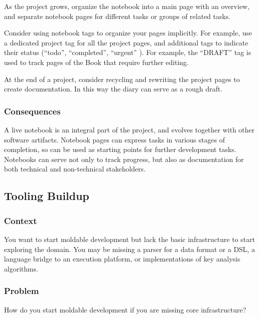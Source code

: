\documentclass[sigconf]{acmart}
\newcommand{\GT}{\lst{GT}\xspace} %
\begin{document}
As the project grows, organize the notebook into a main page with an overview, and separate notebook pages for different tasks or groups of related tasks.

Consider using notebook tags to organize your pages implicitly. For example, use a dedicated project tag for all the project pages, and additional tags to indicate their status (``todo'', ``completed'', ``urgent'' \etc).
For example, the ``DRAFT'' tag is used to track pages of the \GT Book that require further editing.

At the end of a project, consider recycling and rewriting the project pages to create documentation. In this way the diary can serve as a rough draft.

\subsubsection*{Consequences}

A live notebook is an integral part of the project, and evolves together with other software artifacts.
Notebook pages can express tasks in various stages of completion, so can be used as starting points for further development tasks.
Notebooks can serve not only to track progress, but also as documentation for both technical and non-technical stakeholders.

\subsection*{Tooling Buildup}\label{pat:toolingBuildup}
\subsubsection*{Context}
You want to start moldable development but lack the basic infrastructure to start exploring the domain.
You may be missing a parser for a data format or a DSL, a language bridge to an execution platform, or implementations of key analysis algorithms. 

\subsubsection*{Problem}
How do you start moldable development if you are missing core infrastructure?
\end{document}
